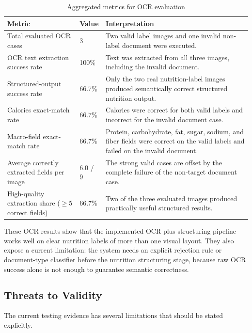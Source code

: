 \begin{table}[H]
	\centering
	\scriptsize
	\renewcommand{\arraystretch}{1.2}
	\begin{tabularx}{\textwidth}{|p{4.2cm}|p{2.4cm}|>{\raggedright\arraybackslash}X|}
		\hline
		\textbf{Metric} & \textbf{Value} & \textbf{Interpretation} \\
		\hline
		Total evaluated OCR cases & 3 & Two valid label images and one invalid non-label document were executed. \\
		\hline
		OCR text extraction success rate & 100\% & Text was extracted from all three images, including the invalid document. \\
		\hline
		Structured-output success rate & 66.7\% & Only the two real nutrition-label images produced semantically correct structured nutrition output. \\
		\hline
		Calories exact-match rate & 66.7\% & Calories were correct for both valid labels and incorrect for the invalid document case. \\
		\hline
		Macro-field exact-match rate & 66.7\% & Protein, carbohydrate, fat, sugar, sodium, and fiber fields were correct on the valid labels and failed on the invalid document. \\
		\hline
		Average correctly extracted fields per image & 6.0 / 9 & The strong valid cases are offset by the complete failure of the non-target document case. \\
		\hline
		High-quality extraction share (\(\geq 5\) correct fields) & 66.7\% & Two of the three evaluated images produced practically useful structured results. \\
		\hline
	\end{tabularx}
	\caption{Aggregated metrics for OCR evaluation}
	\label{tab:ocr-ai-metrics}
\end{table}

These OCR results show that the implemented OCR plus structuring
pipeline works well on clear nutrition labels of more than one visual
layout. They also expose a current limitation: the system needs an
explicit rejection rule or document-type classifier before the
nutrition structuring stage, because raw OCR success alone is not
enough to guarantee semantic correctness.

\subsection{Threats to Validity}

The current testing evidence has several limitations that should be
stated explicitly.

